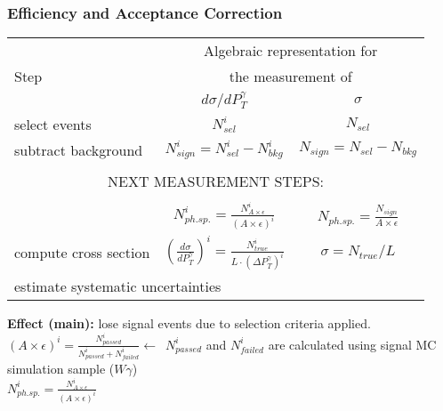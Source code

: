 \begin{frame}\frametitle{Efficiency and Acceptance Correction}

\begin{table}[h]
  \tiny
  \begin{center}
  \begin{tabular}{|l|c|c|}
    \hline
          & \multicolumn{2}{|c|}{Algebraic representation for} \\ 
     Step & \multicolumn{2}{|c|}{the measurement of} \\ 
          & $d\sigma/dP_{T}^{\gamma}$ & $\sigma$ \\ \hline
    select events & {\bfseries{$N_{sel}^i$}} &    {\bfseries{$N_{sel}$}}       \\ \hline
    subtract background & {\bfseries{$N_{sign}^i = N_{sel}^i - N_{bkg}^i$}} &    {\bfseries{$N_{sign}=N_{sel}-N_{bkg}$}}       \\ \hline
    \multicolumn{3}{|c|}{ } \\  
    \multicolumn{3}{|c|}{NEXT MEASUREMENT STEPS:} \\  
    \multicolumn{3}{|c|}{ } \\ \hline 
    {\bfseries\color{blue}{correct for eff X acc}} & {\color{blue}$N_{ph.sp.}^i = \frac{N_{A\times\epsilon}^i}{(A \times\epsilon)^i}$} &  {\color{blue}$N_{ph.sp.}=\frac{N_{sign}}{A\times\epsilon}$}       \\ \hline
    compute cross section & $ \left( \frac{d\sigma}{dP_{T}^\gamma} \right) ^i = \frac{N_{true}^i}{L \cdot (\Delta P_T^\gamma)^i}$  &  $\sigma = N_{true}/L$       \\ \hline
    \multicolumn{3}{|l|}{estimate systematic uncertainties }         \\ \hline
  \end{tabular}
  \label{tab:analysisOutline}
  \end{center}
\end{table}

\footnotesize
{\bfseries{Effect (main):}} lose signal events due to selection criteria applied.\\

\scriptsize
$(A\times\epsilon)^i = \frac{N_{passed}^i}{N_{passed}^i+N_{failed}^i} \leftarrow$~$N_{passed}^i$ and $N_{failed}^i$ are calculated using signal MC simulation sample ($W\gamma$)\\

$N_{ph.sp.}^i = \frac{N_{A\times\epsilon}^i}{(A \times\epsilon)^i}$

\end{frame}%

